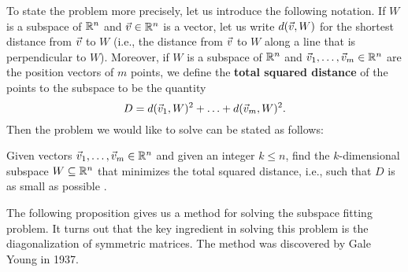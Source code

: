 \documentclass{ximera}
\begin{document}
To state the problem more precisely, let us introduce the following
notation. If $W$ is a subspace of $\mathbb{R}^n$ and $\vec{v}\in\mathbb{R}^n$ is a
vector, let us write $d(\vec{v},W)$ for the shortest distance from
$\vec{v}$ to $W$ (i.e., the distance from $\vec{v}$ to $W$ along a
line that is perpendicular to $W$). Moreover, if $W$ is a subspace of
$\mathbb{R}^n$ and $\vec{v}_1,\ldots,\vec{v}_m\in\mathbb{R}^n$ are the position
vectors of $m$ points, we define the \textbf{total squared distance}%
%
%
%
 of the points to
the subspace to be the quantity
\begin{equation*}
  D = d(\vec{v}_1,W)^2 + \ldots + d(\vec{v}_m,W)^2.
\end{equation*}
Then the problem we would like to solve can be stated as follows:

\begin{problem}\label{prop:subspace-fitting}
  Given vectors $\vec{v}_1,\ldots,\vec{v}_m\in\mathbb{R}^n$ and given an
  integer $k\leq n$, find the $k$-dimensional subspace
  $W\subseteq\mathbb{R}^n$ that minimizes the total squared distance, i.e.,
  such that $D$ is as small as possible%
  .
\end{problem}

The following proposition gives us a method for solving the subspace
fitting problem. It turns out that the key ingredient in solving this
problem is the diagonalization of symmetric matrices. The method was
discovered by Gale Young%
%
 in 1937.
\end{document}
